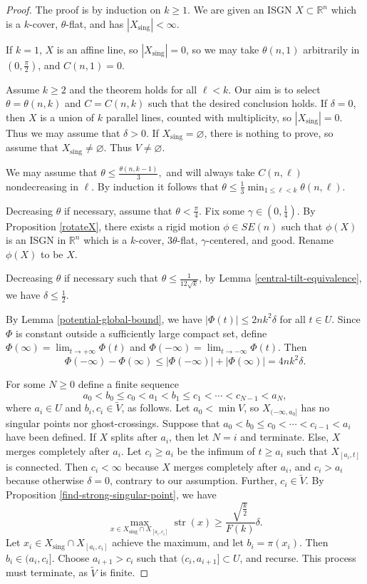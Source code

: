 \documentclass[11pt,reqno,twoside]{amsart}
\newcommand{\sing}{\mathrm{sing}}
\DeclareMathOperator{\strength}{\mathrm{str}}
\theoremstyle{definition}
\begin{document}
\begin{proof}
    The proof is by induction on $k \geq 1$. We are given an ISGN $X \subset \mathbb{R}^n$ which is a $k$-cover, $\theta$-flat, and has $|X_\sing| < \infty$. 
    
    If $k=1$, $X$ is an affine line, so $|X_\sing| = 0$, so we may take $\theta(n,1)$ arbitrarily in $(0,\frac{\pi}{2})$, and $C(n,1) = 0$.
    
    Assume $k \geq 2$ and the theorem holds for all $\ell < k$. Our aim is to select $\theta = \theta(n,k)$ and $C = C(n,k)$ such that the desired conclusion holds. If $\delta = 0$, then $X$ is a union of $k$ parallel lines, counted with multiplicity, so $|X_\sing| = 0$. Thus we may assume that $\delta > 0$. If $X_\sing = \varnothing$, there is nothing to prove, so assume that $X_\sing \neq \varnothing$. Thus $V \neq \varnothing$.
    
    We may assume that $\theta \leq \frac{\theta(n,k-1)}{3},$ and will always take $C(n,\ell)$ nondecreasing in $\ell$. By induction it follows that 
    $\theta \leq \frac{1}{3}\min_{1 \leq \ell < k}\theta(n,\ell).$

    Decreasing $\theta$ if necessary, assume that $\theta < \frac{\pi}{4}.$ Fix some $\gamma \in (0,\frac{1}{4})$. By Proposition \ref{rotateX}, there exists a rigid motion $\phi \in SE(n)$ such that $\phi(X)$ is an ISGN in $\mathbb{R}^n$ which is a $k$-cover, $3\theta$-flat, $\gamma$-centered, and good. Rename $\phi(X)$ to be $X$.

    Decreasing $\theta$ if necessary such that $\theta \leq \frac{1}{12\sqrt{k}}$, by Lemma \ref{central-tilt-equivalence}, we have $\delta \leq \frac{1}{2}$.

    By Lemma \ref{potential-global-bound}, we have $|\Phi(t)| \leq 2nk^2\delta$ for all $t \in U$. Since $\Phi$ is constant outside a sufficiently large compact set, define $\Phi(\infty) = \lim_{t \to +\infty} \Phi(t)$ and $\Phi(-\infty) = \lim_{t \to -\infty} \Phi(t)$. Then \[\Phi(-\infty) - \Phi(\infty) \leq |\Phi(-\infty)| + |\Phi(\infty)| = 4nk^2\delta.\]

    For some $N \geq 0$ define a finite sequence 
    \[a_0 < b_0 \leq c_0 < a_1 < b_1 \leq c_1 < \cdots < c_{N-1} < a_N,\]
    where $a_i \in U$ and $b_i,c_i \in \tilde V$, as follows.
    Let $a_0 < \min V$, so $X_{(-\infty,a_0]}$ has no singular points nor ghost-crossings. Suppose that $a_0 < b_0 \leq c_0 < \cdots < c_{i-1} < a_i$ have been defined. If $X$ splits after $a_i$, then let $N = i$ and terminate. Else, $X$ merges completely after $a_i$. Let $c_i \geq a_i$ be the infimum of $t \geq a_i$ such that $X_{[a_i,t]}$ is connected. Then $c_i < \infty$ because $X$ merges completely after $a_i$, and $c_i > a_i$ because otherwise $\delta = 0$, contrary to our assumption. Further, $c_i \in \tilde V$. By Proposition \ref{find-strong-singular-point}, we have 
    \[\max_{x \in X_{\sing} \cap X_{[a_i,c_i]}} \strength(x) \geq \frac{\sqrt{\frac{k}{2}}}{F(k)} \delta.\]
    Let $x_i \in X_{\sing} \cap X_{[a_i,c_i]}$ achieve the maximum, and let $b_i = \pi(x_i)$. Then $b_i \in (a_i,c_i]$. Choose $a_{i+1} > c_i$ such that $(c_i,a_{i+1}] \subset U$, and recurse.
    This process must terminate, as $\tilde V$ is finite.


\end{proof}
\end{document}

